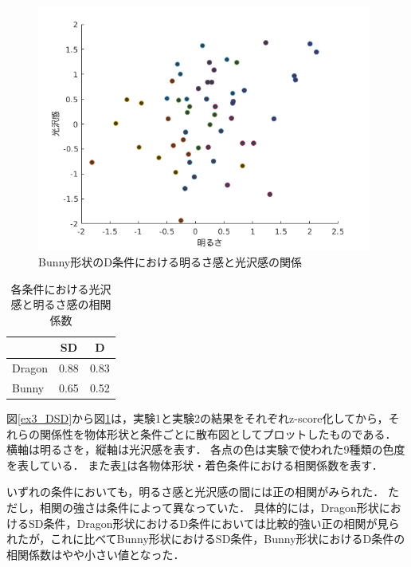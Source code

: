             \begin{figure}[h]
                \centering
                \includegraphics[width=11.0cm]{./img/ex3_BD.png}
                \caption{Bunny形状のD条件における明るさ感と光沢感の関係}
                \label{ex3_BD}
            \end{figure}

            \begin{table}[h]
                \centering
                \caption{各条件における光沢感と明るさ感の相関係数}
                \begin{tabular}{|l||c|c|} \hline
                                & SD       & D        \\ \hline \hline
                    Dragon      & 0.88   & 0.83   \\ \hline
                    Bunny       & 0.65   & 0.52   \\ \hline
                \end{tabular}
                \label{cc}
            \end{table}

            
            図\ref{ex3_DSD}から図\ref{ex3_BD}は，実験1と実験2の結果をそれぞれz-score化してから，それらの関係性を物体形状と条件ごとに散布図としてプロットしたものである．
            横軸は明るさを，縦軸は光沢感を表す．
            各点の色は実験で使われた9種類の色度を表している．
            また表\ref{cc}は各物体形状・着色条件における相関係数を表す．

            いずれの条件においても，明るさ感と光沢感の間には正の相関がみられた．
            ただし，相関の強さは条件によって異なっていた．
            具体的には，Dragon形状におけるSD条件，Dragon形状におけるD条件においては比較的強い正の相関が見られたが，これに比べてBunny形状におけるSD条件，Bunny形状におけるD条件の相関係数はやや小さい値となった．
            
